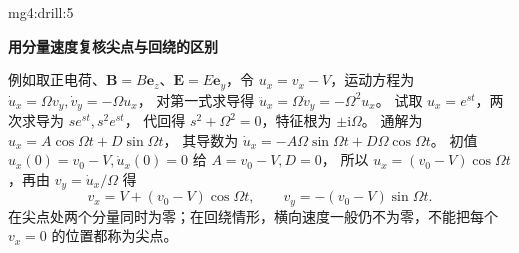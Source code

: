 \begin{drillsolution}{mg4:drill:5}
\par\medskip{}\noindent\textbf{用分量速度复核尖点与回绕的区别}\par\nobreak
例如取正电荷、$\bm B=B\bm e_z$、$\bm E=E\bm e_y$，令 $u_x=v_x-V$，运动方程为
$\dot u_x=\Omega v_y,\dot v_y=-\Omega u_x$，
对第一式求导得 $\ddot u_x=\Omega\dot v_y=-\Omega^2u_x$。
试取 $u_x=e^{st}$，两次求导为 $se^{st},s^2e^{st}$，
代回得 $s^2+\Omega^2=0$，特征根为 $\pm\mathrm i\Omega$。
通解为 $u_x=A\cos\Omega t+D\sin\Omega t$，
其导数为 $\dot u_x=-A\Omega\sin\Omega t+D\Omega\cos\Omega t$。
初值 $u_x(0)=v_0-V,\dot u_x(0)=0$ 给 $A=v_0-V,D=0$，
所以 $u_x=(v_0-V)\cos\Omega t$，再由 $v_y=\dot u_x/\Omega$ 得
\[
v_x=V+(v_0-V)\cos\Omega t,\qquad v_y=-(v_0-V)\sin\Omega t.
\]
在尖点处两个分量同时为零；在回绕情形，横向速度一般仍不为零，不能把每个 $v_x=0$ 的位置都称为尖点。\end{drillsolution}

